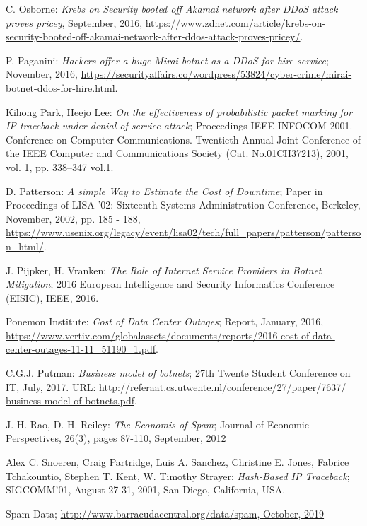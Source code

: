 \begin{thebibliography}{99}
 C. Osborne: \emph{Krebs on Security booted off Akamai network after DDoS attack proves pricey}, September, 2016, \url{https://www.zdnet.com/article/krebs-on-security-booted-off-akamai-network-after-ddos-attack-proves-pricey/}.

 P. Paganini: \emph{Hackers offer a huge Mirai botnet as a DDoS-for-hire-service}; November, 2016, \url{https://securityaffairs.co/wordpress/53824/cyber-crime/mirai-botnet-ddos-for-hire.html}.

 Kihong Park, Heejo Lee: \emph{On the effectiveness of probabilistic packet marking for IP traceback under denial of service attack}; Proceedings IEEE INFOCOM 2001. Conference on Computer Communications. Twentieth Annual Joint Conference of the IEEE Computer and Communications Society (Cat. No.01CH37213), 2001, vol. 1, pp. 338--347 vol.1.

 D. Patterson: \emph{A simple Way to Estimate the Cost of Downtime}; Paper in Proceedings of LISA '02: Sixteenth Systems Administration Conference, Berkeley, November, 2002, pp. 185 - 188, \url{https://www.usenix.org/legacy/event/lisa02/tech/full_papers/patterson/patterson_html/}.

 J. Pijpker, H. Vranken: \emph{The Role of Internet Service Providers in Botnet Mitigation}; 2016 European Intelligence and Security Informatics Conference (EISIC), IEEE, 2016.

 Ponemon Institute: \emph{Cost of Data Center Outages}; Report, January, 2016, \url{https://www.vertiv.com/globalassets/documents/reports/2016-cost-of-data-center-outages-11-11_51190_1.pdf}.

 C.G.J. Putman: \emph{Business model of botnets}; 27th Twente Student Conference on IT, July, 2017. URL: \url{http://referaat.cs.utwente.nl/conference/27/paper/7637/ business-model-of-botnets.pdf}.

 J. H. Rao, D. H. Reiley: \emph{The Economis of Spam}; Journal of Economic Perspectives, 26(3), pages 87-110, September, 2012

 Alex C. Snoeren, Craig Partridge, Luis A. Sanchez, Christine E. Jones, Fabrice Tchakountio, Stephen T. Kent, W. Timothy Strayer: \emph{Hash-Based IP Traceback}; SIGCOMM'01, August 27-31, 2001, San Diego, California, USA.

 Spam Data; \url{http://www.barracudacentral.org/data/spam, October, 2019} %


\end{thebibliography}
